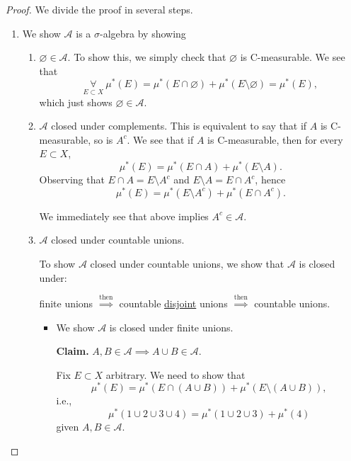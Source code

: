 \begin{proof}\let\qed\relax
	We divide the proof in several steps.
	\begin{enumerate}
		\item We show \(\mathcal{A}\) is a \(\sigma\)-algebra by showing
		      \begin{enumerate}
			      \item \(\varnothing \in \mathcal{A} \). To show this, we simply check that \(\varnothing \) is C-measurable. We see that
			            \[
				            \underset{E\subset X}{\forall}\ \mu^{*} (E) = \mu^{*} (E\cap \varnothing ) + \mu^{*} (E \setminus \varnothing ) = \mu^{*} (E),
			            \]
			            which just shows \(\varnothing \in \mathcal{A}\).
			      \item \(\mathcal{A} \) closed under complements. This is equivalent to say that if \(A\) is C-measurable, so is \(A^{c}\). We see that if \(A\) is C-measurable, then
			            for every \(E\subset X\),
			            \[
				            \mu^{*} (E) = \mu^{*} (E\cap A) + \mu^{*} (E\setminus A).
			            \]
			            Observing that \(E\cap A = E\setminus A^{c} \) and \(E\setminus A = E\cap A^{c} \), hence
			            \[
				            \mu^{*} (E) = \mu^{*} (E\setminus A^{c} ) + \mu^{*} (E\cap A^{c} ).
			            \]
			            \par We immediately see that above implies \(A^{c} \in\mathcal{A} \).
			      \item \(\mathcal{A} \) closed under countable unions.
			            \begin{note}
				            To show \(\mathcal{A} \) closed under countable unions, we show that \(\mathcal{A}\) is closed under:
				            \begin{center}
					            finite unions \(\overset{\text{then}}{\implies}\) countable \underline{disjoint} unions \(\overset{\text{then}}{\implies}\) countable unions.
				            \end{center}
			            \end{note}
			            \begin{itemize}
				            \item\label{pf:Caratheodory-extension-Thm-1-finite-unions} We show \(\mathcal{A} \) is closed under finite unions.

				            \textbf{Claim.} \(A, B\in \mathcal{A} \implies A\cup B\in \mathcal{A}\).
				            \par Fix \(E\subset X\) arbitrary. We need to show that
				            \[
					            \mu^{*} (E) = \mu^{*} (E\cap (A\cup B)) + \mu^{*} (E\setminus (A\cup B)),
				            \]
				            i.e.,
				            \[
					            \mu^{*} (1\cup 2\cup 3\cup 4) = \mu^{*} (1\cup 2\cup 3) + \mu^{*} (4)
				            \]
				            given \(A, B\in\mathcal{A}\).
				            \begin{figure}[H]
					            \centering
					            \label{fig:thm:Caratheodory-extension-Thm-1a}
				            \end{figure}


\end{itemize}
\end{enumerate}
\end{enumerate}
\end{proof}
